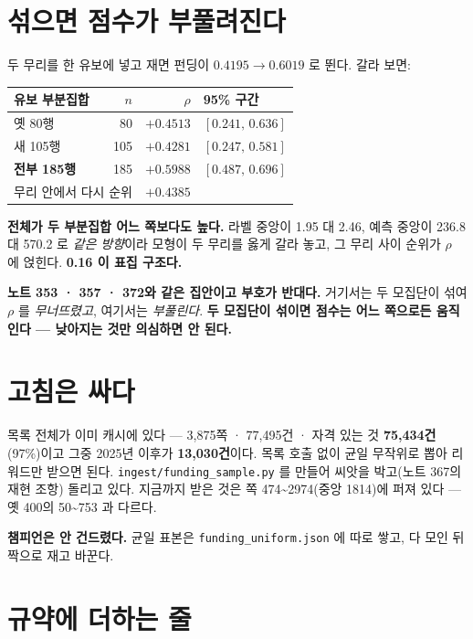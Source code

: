 \documentclass[11pt]{article}
\begin{document}
\section{섞으면 점수가 부풀려진다}

두 무리를 한 유보에 넣고 재면 펀딩이 $0.4195 \to 0.6019$ 로 뛴다. 갈라
보면:

\begin{center}
\begin{tabular}{lrrl}
\hline
유보 부분집합 & $n$ & $\rho$ & 95\% 구간 \\
\hline
옛 80행 & 80 & $+0.4513$ & $[0.241,\,0.636]$ \\
새 105행 & 105 & $+0.4281$ & $[0.247,\,0.581]$ \\
\textbf{전부 185행} & 185 & $\mathbf{+0.5988}$ & $[0.487,\,0.696]$ \\
\hline
\multicolumn{2}{l}{무리 안에서 다시 순위} & $\mathbf{+0.4385}$ & \\
\hline
\end{tabular}
\end{center}

\textbf{전체가 두 부분집합 어느 쪽보다도 높다.} 라벨 중앙이 1.95 대 2.46,
예측 중앙이 236.8 대 570.2 로 \emph{같은 방향}이라 모형이 두 무리를 옳게
갈라 놓고, 그 무리 사이 순위가 $\rho$ 에 얹힌다. \textbf{0.16 이 표집
구조다.}

\textbf{노트 353 · 357 · 372와 같은 집안이고 부호가 반대다.} 거기서는
두 모집단이 섞여 $\rho$ 를 \emph{무너뜨렸고}, 여기서는 \emph{부풀린다}.
\textbf{두 모집단이 섞이면 점수는 어느 쪽으로든 움직인다 --- 낮아지는
것만 의심하면 안 된다.}

\section{고침은 싸다}

목록 전체가 이미 캐시에 있다 --- 3,875쪽 · 77,495건 · 자격 있는 것
\textbf{75,434건}(97\%)이고 그중 2025년 이후가 \textbf{13,030건}이다.
목록 호출 없이 균일 무작위로 뽑아 리워드만 받으면 된다.
\texttt{ingest/funding\_sample.py} 를 만들어 씨앗을 박고(노트 367의 재현
조항) 돌리고 있다. 지금까지 받은 것은 쪽 474\textasciitilde{}2974(중앙
1814)에 퍼져 있다 --- 옛 400의 50\textasciitilde{}753 과 다르다.

\textbf{챔피언은 안 건드렸다.} 균일 표본은 \texttt{funding\_uniform.json}
에 따로 쌓고, 다 모인 뒤 짝으로 재고 바꾼다.

\section{규약에 더하는 줄}
\end{document}
